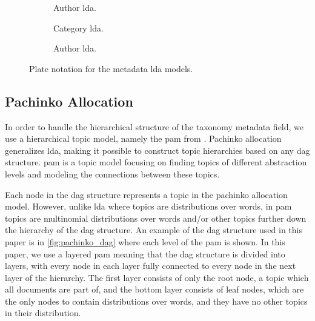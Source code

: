 \begin{figure*}[ht]
	\centering
	\begin{subfigure}{0.275\textwidth}
		\centering
		\resizebox{\textwidth}{!}{%
			
		}
		\caption{Author \gls{lda}.}
		\label{fig:author_lda}
	\end{subfigure}
	\hspace{2em}
	\begin{subfigure}{0.275\textwidth}
		\centering
		\resizebox{\textwidth}{!}{%
		
		}
		\caption{Category \gls{lda}.}
		\label{fig:category_lda}
	\end{subfigure}
	\hspace{2em}
	\begin{subfigure}{0.275\textwidth}
		\centering
		\resizebox{\textwidth}{!}{%
			
		}
		\caption{Author \gls{lda}.}
		\label{fig:author_lda}
	\end{subfigure}	
	\caption{Plate notation for the metadata \gls{lda} models.}
	\label{fig:metadata_lda}
\end{figure*}

\subsection{Pachinko Allocation}
In order to handle the hierarchical structure of the taxonomy metadata field, we use a hierarchical topic model, namely the \acrfull{pam} from \citet{li2006pachinko}.
Pachinko allocation generalizes \gls{lda}, making it possible to construct topic hierarchies based on any \gls{dag} structure.
\gls{pam} is a topic model focusing on finding topics of different abstraction levels and modeling the connections between these topics. 

Each node in the \gls{dag} structure represents a topic in the pachinko allocation model. 
However, unlike \gls{lda} where topics are distributions over words, in \gls{pam} topics are multinomial distributions over words and/or other topics further down the hierarchy of the \gls{dag} structure.
An example of the \gls{dag} structure used in this paper is in \autoref{fig:pachinko_dag} where each level of the \gls{pam} is shown.
In this paper, we use a layered \gls{pam} meaning that the \gls{dag} structure is divided into layers, with every node in each layer fully connected to every node in the next layer of the hierarchy.
The first layer consists of only the root node, a topic which all documents are part of, and the bottom layer consists of leaf nodes, which are the only nodes to contain distributions over words, and they have no other topics in their distribution.

